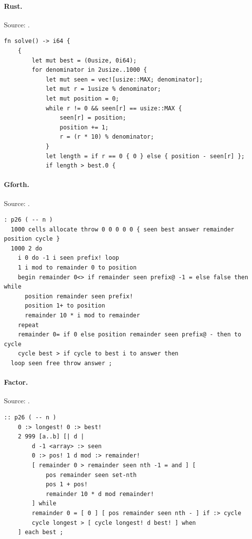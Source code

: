 \paragraph{Rust.} Source: .
\begin{lstlisting}
fn solve() -> i64 {
    {
        let mut best = (0usize, 0i64);
        for denominator in 2usize..1000 {
            let mut seen = vec![usize::MAX; denominator];
            let mut r = 1usize % denominator;
            let mut position = 0;
            while r != 0 && seen[r] == usize::MAX {
                seen[r] = position;
                position += 1;
                r = (r * 10) % denominator;
            }
            let length = if r == 0 { 0 } else { position - seen[r] };
            if length > best.0 {
\end{lstlisting}

\paragraph{Gforth.} Source: .
\begin{lstlisting}
: p26 ( -- n )
  1000 cells allocate throw 0 0 0 0 0 { seen best answer remainder position cycle }
  1000 2 do
    i 0 do -1 i seen prefix! loop
    1 i mod to remainder 0 to position
    begin remainder 0<> if remainder seen prefix@ -1 = else false then while
      position remainder seen prefix!
      position 1+ to position
      remainder 10 * i mod to remainder
    repeat
    remainder 0= if 0 else position remainder seen prefix@ - then to cycle
    cycle best > if cycle to best i to answer then
  loop seen free throw answer ;
\end{lstlisting}

\paragraph{Factor.} Source: .
\begin{lstlisting}
:: p26 ( -- n )
    0 :> longest! 0 :> best!
    2 999 [a..b] [| d |
        d -1 <array> :> seen
        0 :> pos! 1 d mod :> remainder!
        [ remainder 0 > remainder seen nth -1 = and ] [
            pos remainder seen set-nth
            pos 1 + pos!
            remainder 10 * d mod remainder!
        ] while
        remainder 0 = [ 0 ] [ pos remainder seen nth - ] if :> cycle
        cycle longest > [ cycle longest! d best! ] when
    ] each best ;
\end{lstlisting}

